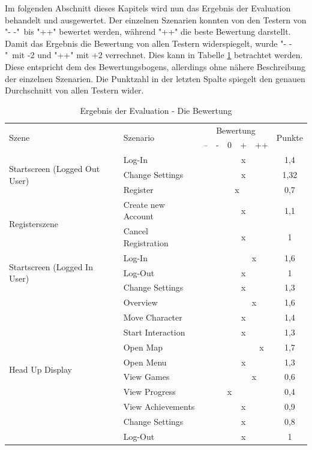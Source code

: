 				Im folgenden Abschnitt dieses Kapitels wird nun das Ergebnis der Evaluation behandelt und ausgewertet. Der einzelnen Szenarien konnten von den Testern von "\-- -"\ bis "++" bewertet werden, während "++" die beste Bewertung darstellt. Damit das Ergebnis die Bewertung von allen Testern widerspiegelt, wurde "\-- -"\ mit -2 und "++" mit +2 verrechnet. Dies kann in Tabelle \ref{tab:ergbnisOverall} betrachtet werden. Diese entspricht dem des Bewertungsbogens, allerdings ohne nähere Beschreibung der einzelnen Szenarien. Die Punktzahl in der letzten Spalte spiegelt den genauen Durchschnitt von allen Testern wider.

\begin{table}[htbp]
	\centering
	\begin{tabular}{|l|l|c|c|c|c|c|c|}
		\hline
		\multirow{2}{*}{Szene} & \multirow{2}{*}{Szenario} &\multicolumn{5}{c}{Bewertung} \vline & \multirow{2}{*}{Punkte} \\ 
		& & -- & - & 0 & + & ++ & \\ \hline
		\multirow{3}{*}{Startscreen (Logged Out User)} & Log-In &  &  &  & x &  & 1,4 \\ 
		& Change Settings &  &  &  & x &  & 1,32 \\ 
		& Register &  &  &\multicolumn{2}{c}{x} \vline &  & 0,7 \\ \hline 
		\multirow{2}{*}{Registerszene} & Create new Account &  &  &  & x &  & 1,1 \\ 
		& Cancel Registration &  &  &  & x &  & 1 \\ \hline 
		\multirow{3}{*}{Startscreen (Logged In User)} & Log-In &  &  &  &\multicolumn{2}{c}{x} \vline & 1,6 \\ 
		& Log-Out &  &  &  & x &  & 1 \\ 
		& Change Settings &  &  &  & x &  & 1,3 \\ \hline 
		\multirow{10}{*}{Head Up Display} & Overview &  &  &  &\multicolumn{2}{c}{x} \vline & 1,6 \\  
		& Move Character &  &  &  & x &  & 1,4 \\  
		& Start Interaction &  &  &  & x &  & 1,3 \\  
		& Open Map &  &  &  &  & x & 1,7 \\  
		& Open Menu &  &  &  & x &  & 1,3 \\  
		& View Games &  &  &  &\multicolumn{2}{c}{x} \vline & 0,6 \\  
		& View Progress &  &  & x &  &  & 0,4 \\
		& View Achievements &  &  &  & x &  & 0,9 \\ 
		& Change Settings &  &  &  & x &  & 0,8 \\ 
		& Log-Out &  &  &  & x &  & 1 \\ 
		\hline
	\end{tabular}
	\caption{Ergebnis der Evaluation - Die Bewertung}
	\label{tab:ergbnisOverall}
\end{table}

